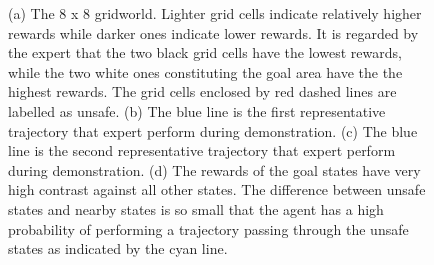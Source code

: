 \begin{figure}[!htb]
\centering
{}
\caption[Navigation task in gridworld]{
(a) The 8 x 8 gridworld. Lighter grid cells indicate relatively higher rewards while darker ones indicate lower rewards. It is regarded by the expert that the two black grid cells have the lowest rewards, while the two white ones constituting the goal area have the the highest rewards. The grid cells enclosed by red dashed lines are labelled as unsafe. (b) The blue line is the first representative trajectory that expert perform during demonstration. (c) The blue line is the second representative trajectory that expert perform during demonstration. (d) The rewards of the goal states have very high contrast against all other states. The difference between unsafe states and nearby states is so small that the agent has a high probability of performing a trajectory passing through the unsafe states as indicated by the cyan line.
}
\label{fig:grid_world1}
\end{figure}

